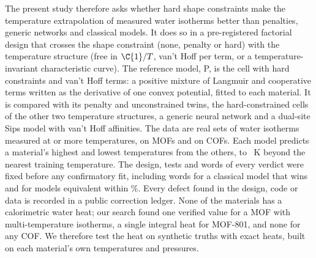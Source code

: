 \documentclass[journal=jcisd8,manuscript=article]{achemso}
\begin{document}
The present study therefore asks whether hard shape constraints make the temperature extrapolation of measured
water isotherms better than penalties, generic networks and classical models. It does so in a pre-registered
factorial design that crosses the shape constraint (none, penalty or hard) with the temperature structure (free in
$\C{1}/T$, van't Hoff per term, or a temperature-invariant characteristic curve). The reference model, P, is the cell
with hard constraints and van't Hoff terms: a positive mixture of Langmuir and cooperative terms written as the
derivative of one convex potential, fitted to each material. It is compared with its penalty and unconstrained twins,
the hard-constrained cells of the other two temperature structures, a generic neural network and a dual-site Sips
model with van't Hoff affinities. The data are  real sets of water isotherms measured at
 or more temperatures,  on MOFs and  on COFs. Each model predicts a
material's highest and lowest temperatures from the others,  to ~K beyond the nearest
training temperature. The design, tests and words of every verdict were fixed
before any confirmatory fit, including words for a classical model that wins and for models equivalent within
\%. Every defect found in the design, code or data is recorded in a public correction ledger. None of
the  materials has a calorimetric water heat; our search found one verified value for a MOF with
multi-temperature isotherms, a single integral heat for MOF-801\cite{kim2016}, and none for any COF. We therefore test
the heat on synthetic truths with exact heats, built on each material's own temperatures and pressures.
\end{document}
